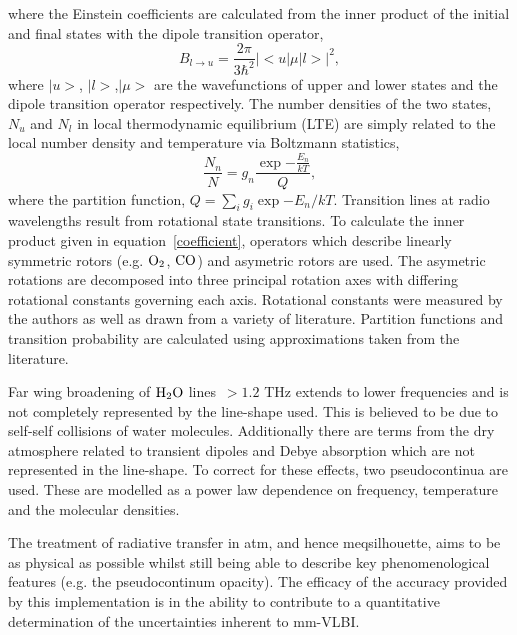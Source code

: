 \noindent where the Einstein coefficients are calculated from the inner product of the initial and final states with the dipole transition operator,\begin{equation}\label{coefficient}
B_{l \to u} = \frac{2\pi}{3\hbar^2} |<u|\mu|l>|^2,
\end{equation}
where $|u>$, $|l>$,$|\mu>$ are the wavefunctions of upper and lower states and the dipole transition operator respectively. The number densities of the two states, $N_u$ and $N_l$ in local thermodynamic equilibrium (LTE) are simply related to the local number density and temperature via Boltzmann statistics, 
\begin{equation}
\frac{N_n}{N} = g_n \frac {\exp{-\frac{E_n}{kT}}}{Q},
\end{equation}
where the partition function, $Q = \sum_i g_i  \exp{-E_n/kT}$. 
Transition lines at radio wavelengths result from rotational state transitions. To calculate the inner product given in equation~\ref{coefficient}, operators which describe linearly symmetric rotors (e.g. ${\rm O_2}$, ${\rm CO}$) and asymetric rotors are used. The asymetric rotations are decomposed into three principal rotation axes with differing rotational constants governing each axis. Rotational constants were measured by the authors as well as drawn from a variety of literature. Partition functions and transition probability are calculated using approximations taken from the literature.
 

Far wing broadening of ${\rm H_2O}$ lines~$> 1.2$ THz extends to lower frequencies and is not completely represented by the line-shape used. This is believed to be due to self-self collisions of water molecules. Additionally there are terms from the dry atmosphere related to transient dipoles and Debye absorption which are not represented in the line-shape. To correct for these effects, two pseudocontinua are used. These are modelled as a power law dependence on frequency, temperature and the molecular densities. 

The treatment of radiative transfer in {\sc atm}, and hence {\sc meqsilhouette}, aims to be as physical as possible whilst still being able to describe key phenomenological features (e.g. the pseudocontinum opacity). The efficacy of the accuracy provided by this implementation is in the ability to contribute to a quantitative determination of the uncertainties inherent to mm-VLBI.
